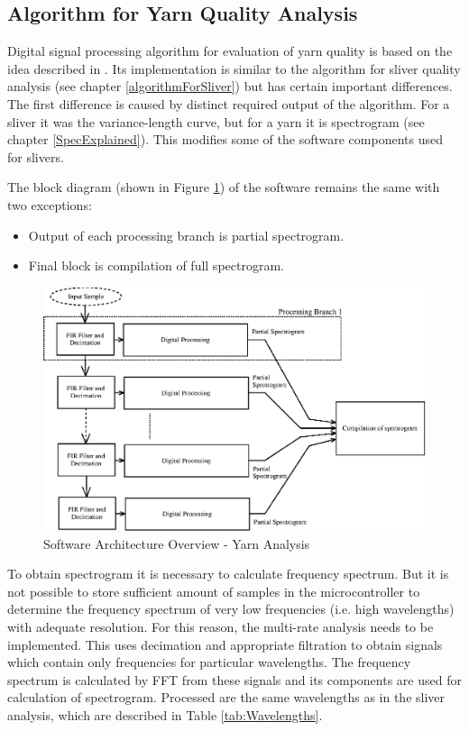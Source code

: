 \documentclass[twoside]{ctuthesis}
\theoremstyle{plain}
\theoremstyle{definition}
\theoremstyle{note}
\begin{document}
\subsection{Algorithm for Yarn Quality Analysis}
Digital signal processing algorithm for evaluation of yarn quality is based on the idea described in \cite{cite:1}. Its implementation is similar to the algorithm for sliver quality analysis (see chapter \ref{algorithmForSliver}) but has certain important differences. The first difference is caused by distinct required output of the algorithm. For a sliver it was the variance-length curve, but for a yarn it is spectrogram (see chapter \ref{SpecExplained}). This modifies some of the software components used for slivers.

The block diagram (shown in Figure \ref{fig:software_overview_yarn}) of the software remains the same with two exceptions:
\begin{itemize}
	\setlength{\itemsep}{5pt}
	\item Output of each processing branch is partial spectrogram. 
	\item Final block is compilation of full spectrogram.
\end{itemize}
\begin{figure}[h]
	\centering
	\includegraphics[width=1.0\textwidth]{system_overview_yarn.eps}
	\caption{Software Architecture Overview - Yarn Analysis}
	\label{fig:software_overview_yarn}
\end{figure}

To obtain spectrogram it is necessary to calculate frequency spectrum. But it is not possible to store sufficient amount of samples in the microcontroller to determine the frequency spectrum of very low frequencies (i.e. high wavelengths) with adequate resolution. For this reason, the multi-rate analysis needs to be implemented. This uses decimation and appropriate filtration to obtain signals which contain only frequencies for particular wavelengths. The frequency spectrum is calculated by FFT from these signals and its components are used for calculation of spectrogram. Processed are the same wavelengths as in the sliver analysis, which are described in Table \ref{tab:Wavelengths}.
\end{document}
